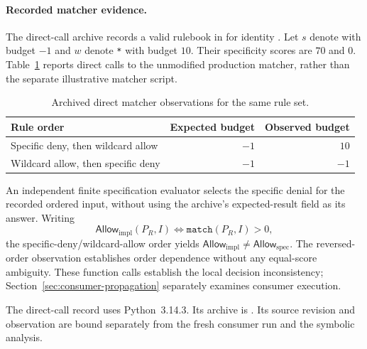 \paragraph{Recorded matcher evidence.}
The direct-call archive records a valid rulebook in
 for identity
. Let $s$ denote
 with budget $-1$ and $w$ denote
\texttt{*} with budget $10$. Their specificity scores are $70$ and $0$.
Table~\ref{tab:matcher-evaluation} reports direct calls to the unmodified
production matcher, rather than the separate illustrative matcher script.

\begin{table}[htbp]
\centering
\small
\begin{tabular}{lrr}
\hline
Rule order & Expected budget & Observed budget \\
\hline
Specific deny, then wildcard allow & $-1$ & $10$ \\
Wildcard allow, then specific deny & $-1$ & $-1$ \\
\hline
\end{tabular}
\caption{Archived direct matcher observations for the same rule set.}
\label{tab:matcher-evaluation}
\end{table}

An independent finite specification evaluator selects the specific denial
for the recorded ordered input, without using the archive's expected-result
field as its answer. Writing
\[
  \mathsf{Allow}_{\mathrm{impl}}(P_R,I)
  \Longleftrightarrow \mathtt{match}(P_R,I)>0,
\]
the specific-deny/wildcard-allow order yields
$\mathsf{Allow}_{\mathrm{impl}}\neq\mathsf{Allow}_{\mathrm{spec}}$.
The reversed-order observation establishes order dependence without any
equal-score ambiguity. These function calls establish the local decision
inconsistency; Section~\ref{sec:consumer-propagation} separately examines
consumer execution.

The direct-call record uses Python~3.14.3. Its archive is
.
Its source revision and observation are bound separately from the fresh
consumer run and the symbolic analysis.
